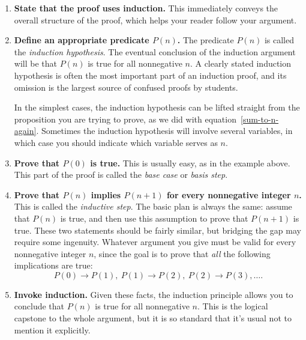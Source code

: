 \begin{enumerate}

\item \textbf{State that the proof uses induction.}  This immediately
  conveys the overall structure of the proof, which helps your reader
  follow your argument.

\item \textbf{Define an appropriate predicate $P(n)$.}  The predicate
  $P(n)$ is called the 
\emph{induction hypothesis}.  The eventual
  conclusion of the induction argument will be that $P(n)$ is true for
  all nonnegative $n$.  A clearly stated induction hypothesis is often
  the most important part of an induction proof, and its omission is
  the largest source of confused proofs by students.

In the simplest cases, the induction hypothesis can be lifted straight
from the proposition you are trying to prove, as we did with
equation~\eqref{sum-to-n-again}.  Sometimes the induction hypothesis
will involve several variables, in which case you should indicate
which variable serves as $n$.

\item \textbf{Prove that $P(0)$ is true.}  This is usually easy, as in the
  example above.  This part of the proof is called the \emph{base case}%
  or \emph{basis step}.\iffalse
  (Sometimes the base case will be $n=1$ or even
  some larger number, in which case the starting value of $n$ also should
  be stated.)\fi

\item \textbf{Prove that $P(n)$ implies $P(n+1)$ for every nonnegative
  integer $n$.}  This is called the \emph{inductive
  step}.  The basic plan is always the
  same: assume that $P(n)$ is true, and then use this assumption to
  prove that $P(n+1)$ is true.  These two statements should be fairly
  similar, but bridging the gap may require some ingenuity.  Whatever
  argument you give must be valid for every nonnegative integer $n$,
  since the goal is to prove that \emph{all} the following
  implications are true:
\[
P(0) \rightarrow P(1),\  P(1) \rightarrow  P(2),\  P(2) \rightarrow P(3), \dots.
\]

\item \textbf{Invoke induction.}  Given these facts, the induction
  principle allows you to conclude that $P(n)$ is true for all nonnegative
  $n$.  This is the logical capstone to the whole argument, but it is so
  standard that it's usual not to mention it explicitly.

\end{enumerate}

